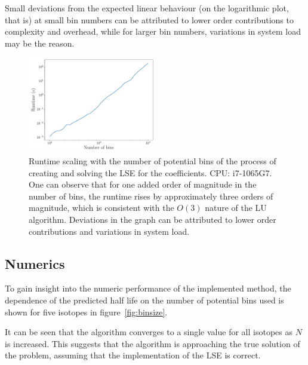 \documentclass[a4paper,DIV=12,english]{scrartcl}
\begin{document}
Small deviations from the expected linear behaviour (on the logarithmic plot, that is) at small bin numbers can be attributed to lower order contributions to complexity and overhead, while for larger bin numbers, variations in system load may be the reason.
\begin{figure}
    \centering
    \includegraphics[width=0.5\textwidth]{../plots/runtime.pdf}
    \caption{Runtime scaling with the number of potential bins of the process of creating and solving the LSE for the coefficients. CPU: i7-1065G7. One can observe that for one added order of magnitude in the number of bins, the runtime rises by approximately three orders of magnitude, which is consistent with the $O(3)$ nature of the LU algorithm. Deviations in the graph can be attributed to lower order contributions and variations in system load.}
    \label{fig:bench}
\end{figure}

\subsection{Numerics}
To gain insight into the numeric performance of the implemented method, the dependence of the predicted half life on the number of potential bins used is shown for five isotopes in figure~\ref{fig:binsize}. 

It can be seen that the algorithm converges to a single value for all isotopes as $N$ is increased. This suggests that the algorithm is approaching the true solution of the problem, assuming that the implementation of the LSE is correct.
\end{document}
